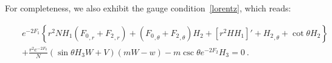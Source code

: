 For completeness, we also exhibit the gauge condition~\eqref{lorentz}, which reads:


\begin{eqnarray}
&&
e^{-2 {F_1}} \left\{r^2 N{H_1}( {F_0}_{,r}+ {F_2}_{,r})
+({F_0}_{,\theta} + {F_2}_{,\theta} ){H_2}
+[r^2 H  {H_1}]'
+ {H_2}_{,\theta}
+\cot \theta {H_2}
\right\}
 \nonumber \\
%
&&
+\frac{r^2e^{-2 {F_0}}}{N}
 (\sin \theta  {H_3} W+  V)(mW-w)
-{m} \csc \theta e^{-2 {F_2}} {H_3}=0 \ .
\end{eqnarray}


%
